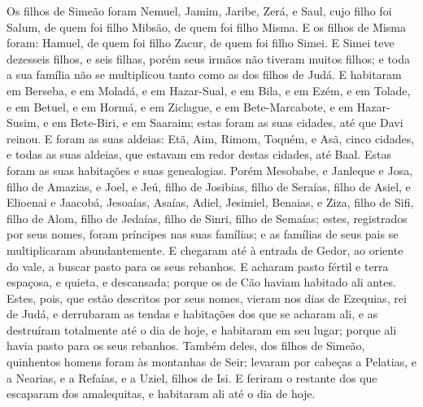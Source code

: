 Os filhos de Simeão foram Nemuel, Jamim, Jaribe, Zerá, e Saul,
cujo filho foi Salum, de quem foi filho Mibsão, de quem foi
filho Misma. E os filhos de Misma foram: Hamuel, de quem foi
filho Zacur, de quem foi filho Simei. E Simei teve dezesseis
filhos, e seis filhas, porém seus irmãos não tiveram muitos filhos;
e toda a sua família não se multiplicou tanto como as dos filhos de
Judá. E habitaram em Berseba, e em Moladá, e em Hazar-Sual,
e em Bila, e em Ezém, e em Tolade, e em Betuel, e em
Hormá, e em Ziclague, e em Bete-Marcabote, e em Hazar-Susim,
e em Bete-Biri, e em Saaraim; estas foram as suas cidades, até que
Davi reinou. E foram as suas aldeias: Etã, Aim, Rimom,
Toquém, e Asã, cinco cidades, e todas as suas aldeias, que
estavam em redor destas cidades, até Baal. Estas foram as suas
habitações e suas genealogias. Porém Mesobabe, e Janleque e
Josa, filho de Amazias, e Joel, e Jeú, filho de Josibias,
filho de Seraías, filho de Asiel, e Elioenai e Jaacobá,
Jesoaías, Asaías, Adiel, Jesimiel, Benaias, e Ziza, filho de
Sifi, filho de Alom, filho de Jedaías, filho de Sinri, filho de
Semaías; estes, registrados por seus nomes, foram príncipes
nas suas famílias; e as famílias de seus pais se multiplicaram
abundantemente. E chegaram até à entrada de Gedor, ao oriente
do vale, a buscar pasto para os seus rebanhos. E acharam
pasto fértil e terra espaçosa, e quieta, e descansada; porque os de
Cão haviam habitado ali antes. Estes, pois, que estão
descritos por seus nomes, vieram nos dias de Ezequias, rei de Judá,
e derrubaram as tendas e habitações dos que se acharam ali, e as
destruíram totalmente até o dia de hoje, e habitaram em seu lugar;
porque ali havia pasto para os seus rebanhos. Também deles,
dos filhos de Simeão, quinhentos homens foram às montanhas de Seir;
levaram por cabeças a Pelatias, e a Nearias, e a Refaías, e a Uziel,
filhos de Isi. E feriram o restante dos que escaparam dos
amalequitas, e habitaram ali até o dia de hoje.

\medskip

